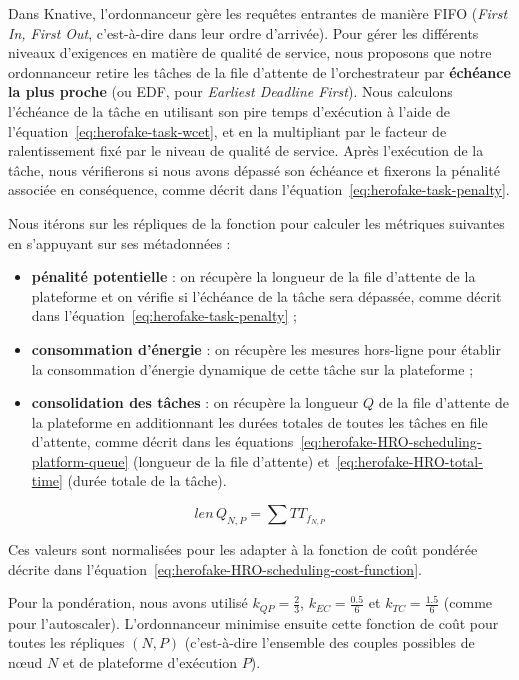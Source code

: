 Dans Knative, l'ordonnanceur gère les requêtes entrantes de manière FIFO (\textit{First In, First Out}, c'est-à-dire dans leur ordre d'arrivée). Pour gérer les différents niveaux d'exigences en matière de qualité de service, nous proposons que notre ordonnanceur retire les tâches de la file d'attente de l'orchestrateur par \textbf{échéance la plus proche} (ou EDF, pour \textit{Earliest Deadline First}). Nous calculons l'échéance de la tâche en utilisant son pire temps d'exécution à l'aide de l'équation~\ref{eq:herofake-task-wcet}, et en la multipliant par le facteur de ralentissement fixé par le niveau de qualité de service. Après l'exécution de la tâche, nous vérifierons si nous avons dépassé son échéance et fixerons la pénalité associée en conséquence, comme décrit dans l'équation~\ref{eq:herofake-task-penalty}. 

Nous itérons sur les répliques de la fonction pour calculer les métriques suivantes en s'appuyant sur ses métadonnées :

\begin{itemize}
    \item \textbf{pénalité potentielle} : on récupère la longueur de la file d'attente de la plateforme et on vérifie si l'échéance de la tâche sera dépassée, comme décrit dans l'équation~\ref{eq:herofake-task-penalty} ;
    \item \textbf{consommation d'énergie} : on récupère les mesures hors-ligne pour établir la consommation d'énergie dynamique de cette tâche sur la plateforme ;
    \item \textbf{consolidation des tâches} : on récupère la longueur $Q$ de la file d'attente de la plateforme en additionnant les durées totales de toutes les tâches en file d'attente, comme décrit dans les équations~\ref{eq:herofake-HRO-scheduling-platform-queue} (longueur de la file d'attente) et~\ref{eq:herofake-HRO-total-time} (durée totale de la tâche). 
\end{itemize}

\begin{equation}
    len \, Q_{N, P} = \sum TT_{f_{N, P}}
\label{eq:herofake-HRO-scheduling-platform-queue}
\end{equation}

Ces valeurs sont normalisées pour les adapter à la fonction de coût pondérée décrite dans l'équation~\ref{eq:herofake-HRO-scheduling-cost-function}.

Pour la pondération, nous avons utilisé $k_{QP} = \frac{2}{3}$, $k_{EC} = \frac{0.5}{6}$ et $k_{TC} = \frac{1.5}{6}$ (comme pour l'autoscaler). L'ordonnanceur minimise ensuite cette fonction de coût pour toutes les répliques $(N, P)$ (c'est-à-dire l'ensemble des couples possibles de nœud $N$ et de plateforme d'exécution $P$).

